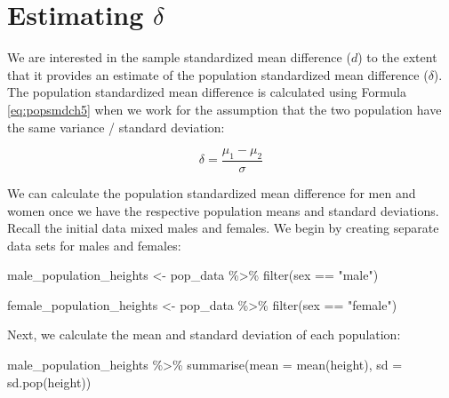 \documentclass[
]{krantz}
\makeatletter
\newenvironment{Shaded}{\begin{snugshade}}{\end{snugshade}}
\newcommand{\AttributeTok}[1]{\textcolor[rgb]{0.61,0.61,0.61}{#1}}
\newcommand{\FunctionTok}[1]{\textcolor[rgb]{0,0,0}{#1}}
\newcommand{\NormalTok}[1]{#1}
\newcommand{\OtherTok}[1]{\textcolor[rgb]{0.37,0.37,0.37}{#1}}
\newcommand{\SpecialCharTok}[1]{\textcolor[rgb]{0,0,0}{#1}}
\newcommand{\StringTok}[1]{\textcolor[rgb]{0.5,0.5,0.5}{#1}}
\newenvironment{kframe}{%
\medskip{}
\setlength{\fboxsep}{.8em}
 \def\at@end@of@kframe{}%
 \ifinner\ifhmode%
  \def\at@end@of@kframe{\end{minipage}}%
  \begin{minipage}{\columnwidth}%
 \fi\fi%
 \def\FrameCommand##1{\hskip\@totalleftmargin \hskip-\fboxsep
 \colorbox{shadecolor}{##1}\hskip-\fboxsep
     \hskip-\linewidth \hskip-\@totalleftmargin \hskip\columnwidth}%
 \MakeFramed {\advance\hsize-\width
   \@totalleftmargin\z@ \linewidth\hsize
   \@setminipage}}%
 {\par\unskip\endMakeFramed%
 \at@end@of@kframe}
\renewenvironment{Shaded}{\begin{kframe}}{\end{kframe}}
\makeatother
\begin{document}
\hypertarget{estimating-delta}{%
\section{\texorpdfstring{Estimating \(\delta\)}{Estimating \textbackslash delta}}\label{estimating-delta}}

We are interested in the sample standardized mean difference (\(d\)) to the extent that it provides an estimate of the population standardized mean difference (\(\delta\)). The population standardized mean difference is calculated using Formula \eqref{eq:popsmdch5} when we work for the assumption that the two population have the same variance / standard deviation:

\begin{equation} 
\delta  = \frac{\mu_{1} - \mu_{2}}{\sigma} 
      \label{eq:popsmdch5}
\end{equation}

We can calculate the population standardized mean difference for men and women once we have the respective population means and standard deviations. Recall the initial data mixed males and females. We begin by creating separate data sets for males and females:

\begin{Shaded}
\begin{Highlighting}[]
\NormalTok{male\_population\_heights }\OtherTok{\textless{}{-}}\NormalTok{ pop\_data }\SpecialCharTok{\%\textgreater{}\%} 
  \FunctionTok{filter}\NormalTok{(sex }\SpecialCharTok{==} \StringTok{"male"}\NormalTok{) }

\NormalTok{female\_population\_heights }\OtherTok{\textless{}{-}}\NormalTok{ pop\_data }\SpecialCharTok{\%\textgreater{}\%} 
  \FunctionTok{filter}\NormalTok{(sex }\SpecialCharTok{==} \StringTok{"female"}\NormalTok{) }
\end{Highlighting}
\end{Shaded}

Next, we calculate the mean and standard deviation of each population:

\begin{Shaded}
\begin{Highlighting}[]
\NormalTok{male\_population\_heights }\SpecialCharTok{\%\textgreater{}\%} 
  \FunctionTok{summarise}\NormalTok{(}\AttributeTok{mean =} \FunctionTok{mean}\NormalTok{(height),}
            \AttributeTok{sd =} \FunctionTok{sd.pop}\NormalTok{(height))}
\end{Highlighting}
\end{Shaded}
\end{document}
